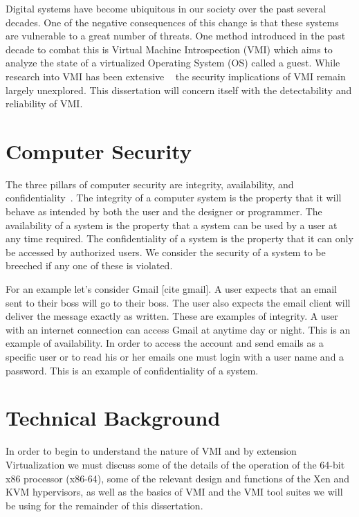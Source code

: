 Digital systems have become ubiquitous in our society over the past several decades. One of the negative consequences of this change is that these systems are vulnerable to a great number of threats. One method introduced in the past decade to combat this is Virtual Machine Introspection (VMI) which aims to analyze the state of a virtualized Operating System (OS) called a guest. While research into VMI has been extensive ~\cite{bahram_dksm:_2010,pfoh_exploiting_2010,dolan-gavitt_leveraging_2011,dolan-gavitt_virtuoso:_2011,gu_process_2011-1,fu_bridging_2013,garfinkel_virtual_2003,hay_forensics_2008} the security implications of VMI remain largely unexplored. This dissertation will concern itself with the detectability and reliability of VMI.



\section{Computer Security}

The three pillars of computer security are integrity, availability, and confidentiality~\cite{bishop_computer_2012}.  The integrity of a computer system is the property that it will behave as intended by both the user and the designer or programmer.  The availability of a system is the property that a system can be used by a user at any time required. The confidentiality of a system is the property that it can only be accessed by authorized users.  We consider the security of a system to be breeched if any one of these is violated. 

For an example let's consider Gmail [cite gmail].  A user expects that an email sent to their boss will go to their boss. The user also expects the email client will deliver the message exactly as written. These are examples of integrity. A user with an internet connection can access Gmail at anytime day or night. This is an example of availability. In order to access the account and send emails as a specific user or to read his or her emails one must login with a user name and a password.  This is an example of confidentiality of a system. 

\section{Technical Background}
In order to begin to understand the nature of VMI and by extension Virtualization we must discuss some of the details of the operation of the 64-bit x86 processor (x86-64), some of the relevant design and functions of the Xen and KVM hypervisors, as well as the basics of VMI and the VMI tool suites we will be using for the remainder of this dissertation. 

